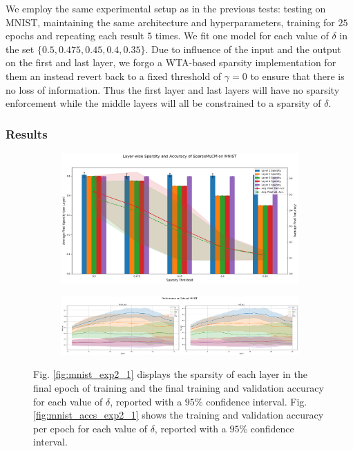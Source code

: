 \documentclass[a4paper,12pt]{report}
\begin{document}
We employ the same experimental setup as in the previous tests: testing on MNIST, maintaining 
the same architecture and hyperparameters, training for $25$ epochs and repeating each 
result $5$ times. We fit one model for each value of $\delta$ in the set 
$\{0.5, 0.475, 0.45, 0.4, 0.35\}$. Due to influence of the input and the output on 
the first and last layer, we forgo a WTA-based sparsity implementation for them an 
instead revert back to a fixed threshold of $\gamma = 0$ to ensure that there is no 
loss of information. Thus the first layer and last layers will have no sparsity 
enforcement while the middle layers will all be constrained to a sparsity of $\delta$.
\subsubsection*{Results}
\begin{figure}[h!]
    \centering
    \begin{subfigure}{\textwidth}
        \includegraphics[width=\linewidth]{pictures/mnist_exp2_2.png}
        \caption{}\label{fig:mnist_exp2_2}
    \end{subfigure}
    \hfill
    \begin{subfigure}{1\textwidth}
        \includegraphics[width=\linewidth]{pictures/mnist_accs_exp2_2.png}
        \caption{}\label{fig:mnist_accs_exp2_2}
    \end{subfigure}
    \caption{Fig. \ref{fig:mnist_exp2_1} displays the sparsity of each layer in the 
    final epoch of training and the final training and validation accuracy for each 
    value of $\delta$, reported with a $95\%$ confidence interval.
    Fig. \ref{fig:mnist_accs_exp2_1} shows the training and validation accuracy per epoch
    for each value of $\delta$, reported with a $95\%$ confidence interval.}
    \label{fig:exp2_2}
\end{figure}
\end{document}
